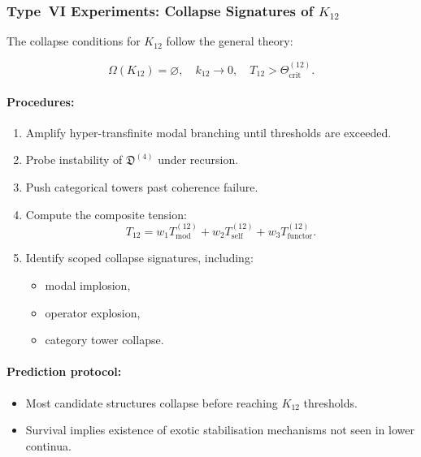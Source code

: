 \subsubsection{Type~VI Experiments: Collapse Signatures of $K_{12}$}

The collapse conditions for $K_{12}$ follow the general theory:

\[
  \Omega(K_{12}) = \varnothing,
  \quad
  k_{12} \rightarrow 0,
  \quad
  T_{12} > \Theta_{\mathrm{crit}}^{(12)}.
\]

\paragraph{Procedures:}

\begin{enumerate}
    \item Amplify hyper-transfinite modal branching until
          thresholds are exceeded.
    \item Probe instability of $\mathfrak{D}^{(4)}$ under recursion.
    \item Push categorical towers past coherence failure.
    \item Compute the composite tension:
          \[
            T_{12} = w_1 T_{\mathrm{mod}}^{(12)}
                     + w_2 T_{\mathrm{self}}^{(12)}
                     + w_3 T_{\mathrm{functor}}^{(12)}.
          \]
    \item Identify scoped collapse signatures, including:
          \begin{itemize}
              \item modal implosion,
              \item operator explosion,
              \item category tower collapse.
          \end{itemize}
\end{enumerate}

\paragraph{Prediction protocol:}

\begin{itemize}
    \item Most candidate structures collapse before reaching
          $K_{12}$ thresholds.
    \item Survival implies existence of exotic stabilisation
          mechanisms not seen in lower continua.
\end{itemize}



